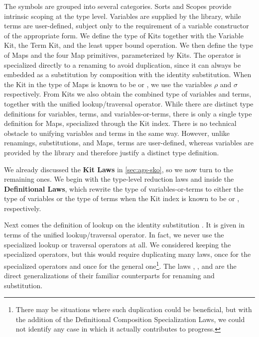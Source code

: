 \documentclass[screen,nonacm]{acmart}
\begin{document}
The symbols are grouped into several categories. Sorts and Scopes provide
intrinsic scoping at the type level. Variables are supplied by the library,
while terms are user-defined, subject only to the requirement of a variable
constructor of the appropriate form. We define the type of Kits together with
the Variable Kit, the Term Kit, and the least upper bound operation. We then
define the type of Maps and the four Map primitives, parameterized by Kits. The
operator  is specialized directly to a renaming to avoid
duplication, since it can always be embedded as a substitution by composition
with the identity substitution. When the Kit in the type of Maps is known to be
 or , we use the variables $ρ$ and $σ$
respectively. From Kits we also obtain the combined type of variables and
terms, together with the unified lookup/traversal operator. While there are
distinct type definitions for variables, terms, and variables-or-terms, there
is only a single type definition for Maps, specialized through the Kit index.
There is no technical obstacle to unifying variables and terms in the same way.
However, unlike renamings, substitutions, and Maps, terms are user-defined,
whereas variables are provided by the library and therefore justify a distinct
type definition.

We already discussed the \textbf{Kit Laws} in \cref{sec:ags-sko}, so we now
turn to the remaining ones. We begin with the type-level reduction laws
 and  inside the \textbf{Definitional
      Laws}, which rewrite the type of variables-or-terms to either the type of
variables or the type of terms when the Kit index is known to be
 or , respectively.

Next comes the definition of lookup on the identity substitution
. It is given in terms of the unified lookup/traversal
operator. In fact, we never use the specialized lookup or traversal operators
at all. We considered keeping the specialized operators, but this would require
duplicating many laws, once for the specialized operators and once for the
general one\footnote{There may be situations where such duplication could be
      beneficial, but with the addition of the Definitional Composition
      Specialization Laws, we could not identify any case in which it actually
      contributes to progress.}. The laws , , and
 are the direct generalizations of their familiar
counterparts for renaming and substitution.
\end{document}
